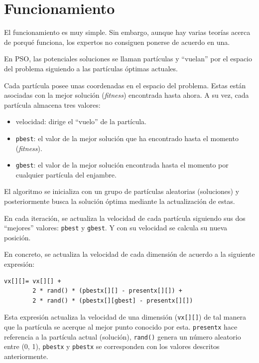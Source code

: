 \documentclass[a4paper,12pt,titlepage]{article}
\begin{document}
\section{Funcionamiento}

El funcionamiento es muy simple. Sin embargo, aunque hay varias teorías acerca de porqué funciona, los expertos no consiguen ponerse de acuerdo en una.

En PSO, las potenciales soluciones se llaman partículas y “vuelan” por el espacio del problema siguiendo a las partículas óptimas actuales. 

Cada partícula posee unas coordenadas en el espacio del problema. Estas están asociadas con la mejor solución (\textit{fitness}) encontrada hasta ahora. A su vez, cada partícula almacena tres valores:

\begin{itemize}[noitemsep]
	\item velocidad: dirige el “vuelo” de la partícula.
	\item \lstinline|pbest|: el valor de la mejor solución que ha encontrado hasta el momento (\textit{fitness}).
	\item \lstinline|gbest|: el valor de la mejor solución encontrada hasta el momento por cualquier partícula del enjambre.
\end{itemize}

El algoritmo se inicializa con un grupo de partículas aleatorias (soluciones) y posteriormente busca la solución óptima mediante la actualización de estas.

En cada iteración, se actualiza la velocidad de cada partícula siguiendo sus dos “mejores” valores: \lstinline|pbest| y  \lstinline|gbest|. Y con su velocidad se calcula su nueva posición.

En concreto, se actualiza la velocidad de cada dimensión de acuerdo a la siguiente expresión:

\begin{lstlisting}
vx[][]= vx[][] +
		2 * rand() * (pbestx[][] - presentx[][]) +
		2 * rand() * (pbestx[][gbest] - presentx[][])
\end{lstlisting}

Esta expresión actualiza la velocidad de una dimensión (\lstinline|vx[][]|) de tal manera que la partícula se acerque al mejor punto conocido por esta. \lstinline|presentx| hace referencia a la partícula actual (solución), \lstinline|rand()| genera un número aleatorio entre (0, 1), \lstinline|pbestx| y \lstinline|pbestx| se corresponden con los valores descritos anteriormente.
\end{document}
